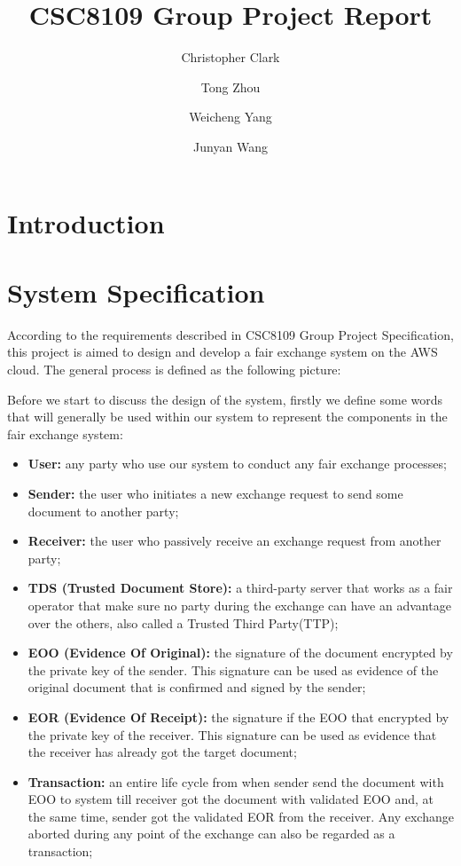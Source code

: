 \documentclass[runningheads]{llncs}
\title{CSC8109 Group Project Report} %
\author{Christopher Clark \and Tong Zhou \and Weicheng Yang \and Junyan Wang}
\institute{School of Computing, Newcastle University \\ Newcastle upon Tyne, NE4 5TG}
\begin{document}
\maketitle


\section{Introduction} 


\section{System Specification} 
According to the requirements described in CSC8109 Group Project Specification, this project is aimed to design and develop a fair exchange system on the AWS cloud. The general process is defined as the following picture:

Before we start to discuss the design of the system, firstly we define some words that will generally be used within our system to represent the components in the fair exchange system:

\begin{itemize}
	\item \textbf{User:} any party who use our system to conduct any fair exchange processes;
	\item \textbf{Sender:} the user who initiates a new exchange request to send some document to another party;
	\item \textbf{Receiver:} the user who passively receive an exchange request from another party;
	\item \textbf{TDS (Trusted Document Store):} a third-party server that works as a fair operator that make sure no party during the exchange can have an advantage over the others, also called a Trusted Third Party(TTP);
	\item \textbf{EOO (Evidence Of Original):} the signature of the document encrypted by the private key of the sender. This signature can be used as evidence of the original document that is confirmed and signed by the sender;
	\item \textbf{EOR (Evidence Of Receipt):} the signature if the EOO that encrypted by the private key of the receiver. This signature can be used as evidence that the receiver has already got the target document;
	\item \textbf{Transaction:} an entire life cycle from when sender send the document with EOO to system till receiver got the document with validated EOO and, at the same time, sender got the validated EOR from the receiver. Any exchange aborted during any point of the exchange can also be regarded as a transaction;
\end{itemize}
\end{document}
